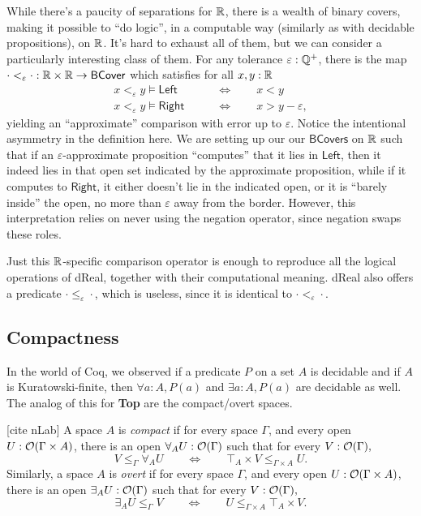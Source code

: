 While there's a paucity of separations for $\mathbb{R}$, there is a wealth of binary covers, making it possible to ``do logic'', in a computable way (similarly as with decidable propositions), on $\mathbb{R}$. It's hard to exhaust all of them, but we can consider a particularly interesting class of them. For any tolerance $\varepsilon : \mathbb{Q}^+$, there is the map $\cdot <_\varepsilon \cdot : \mathbb{R} \times \mathbb{R} \to \mathsf{BCover}$ which satisfies for all $x, y : \mathbb{R}$
\begin{align*}
x <_\varepsilon y \models \mathsf{Left} 
\qquad &\Leftrightarrow \qquad
x < y
\\
x <_\varepsilon y \models \mathsf{Right} 
\qquad &\Leftrightarrow \qquad
x > y - \varepsilon,
\end{align*}
yielding an ``approximate'' comparison with error up to $\varepsilon$. Notice the intentional asymmetry in the definition here. We are setting up our our $\mathsf{BCovers}$ on $\mathbb{R}$ such that if an $\varepsilon$-approximate proposition ``computes'' that it lies in $\mathsf{Left}$, then it indeed lies in that open set indicated by the approximate proposition, while if it computes to $\mathsf{Right}$, it either doesn't lie in the indicated open, or it is ``barely inside'' the open, no more than $\varepsilon$ away from the border. However, this interpretation relies on never using the negation operator, since negation swaps these roles.

Just this $\mathbb{R}$-specific comparison operator is enough to reproduce all the logical operations of dReal, together with their computational meaning. dReal also offers a predicate $\cdot \le_\varepsilon \cdot$, which is useless, since it is identical to $\cdot <_\varepsilon \cdot$.

\subsection{Compactness}

In the world of Coq, we observed if a predicate $P$ on a set $A$ is decidable and if $A$ is Kuratowski-finite, then $\forall a : A, P(a)$ and $\exists a : A, P(a)$ are decidable as well. The analog of this for \textbf{Top} are the compact/overt spaces.

[cite nLab]
A space $A$ is \emph{compact} if for every space $\Gamma$, and every open $U : \mathcal{O}({\Gamma \times A})$, there is an open $\forall_A U : \mathcal{O}({\Gamma})$ such that for every $V : \mathcal{O}({\Gamma}),$
\[
V \le_\Gamma \forall_A U \qquad \Leftrightarrow \qquad \top_A \times V \le_{\Gamma \times A} U.
\]
Similarly, a space $A$ is \emph{overt} if for every space $\Gamma$, and every open $U : \mathcal{O}({\Gamma \times A})$, there is an open $\exists_A U : \mathcal{O}({\Gamma})$ such that for every $V : \mathcal{O}({\Gamma}),$
\[
\exists_A U \le_\Gamma V  \qquad \Leftrightarrow \qquad U  \le_{\Gamma \times A} \top_A \times V.
\]

